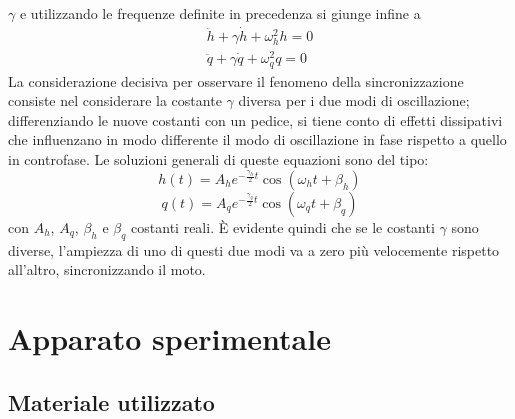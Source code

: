 \documentclass[11pt, a4paper, twoside]{article}
\begin{document}
$\gamma$ e utilizzando le frequenze definite in precedenza si giunge infine a
\begin{equation*}
  \begin{split}
  \ddot h + \gamma \dot h + \omega_h^2 h  = 0 \\
  \ddot q +\gamma \dot q + \omega_q^2 q = 0 
  \end{split}
\end{equation*}
La considerazione decisiva per osservare il fenomeno della sincronizzazione 
consiste nel considerare la costante $\gamma$ diversa per i due modi di oscillazione;
differenziando le nuove costanti con un pedice, si tiene conto di 
effetti dissipativi che influenzano in modo differente il modo di oscillazione
in fase rispetto a quello in controfase.
Le soluzioni generali di queste equazioni sono del tipo:
\begin{equation}
    h(t) = A_h e^{- \frac{\gamma_h}{2} t} \cos(\omega_h t + \beta_h)
    \label{equazionefinaleh}
  \end{equation}
    \begin{equation}
    q(t) = A_q e^{- \frac{\gamma_q}{2} t} \cos(\omega_q t + \beta_q)
     \label{equazionefinaleq}
    \end{equation}
con $A_h$, $A_q$, $\beta_h$ e $\beta_q$ costanti reali.
È evidente quindi che se le costanti $\gamma$ sono diverse, l'ampiezza di uno di questi due modi va a zero più velocemente rispetto 
all'altro, sincronizzando il moto.

\section{Apparato sperimentale}
\subsection{Materiale utilizzato}
\end{document}

